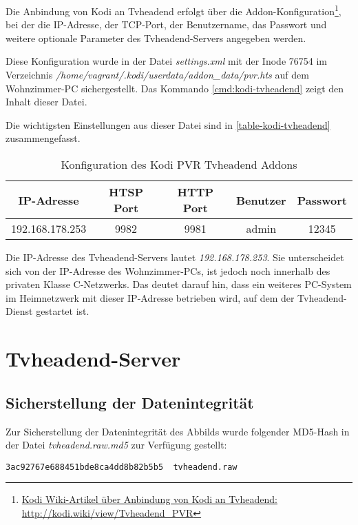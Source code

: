 Die Anbindung von Kodi an Tvheadend erfolgt über die Addon-Konfiguration\footnote{\href{http://kodi.wiki/view/Tvheadend\_PVR\#Connecting\_Kodi\_to\_Tvheadend}{Kodi Wiki-Artikel über Anbindung von Kodi an Tvheadend: http://kodi.wiki/view/Tvheadend\_PVR}}, bei der die IP-Adresse, der TCP-Port, der Benutzername, das Passwort und weitere optionale Parameter des Tvheadend-Servers angegeben werden.

Diese Konfiguration wurde in der Datei \textit{settings.xml} mit der Inode 76754 im Verzeichnis \textit{/home/vagrant/.kodi/userdata/addon\_data/pvr.hts} auf dem Wohnzimmer-PC sichergestellt. Das Kommando \autoref{cmd:kodi-tvheadend} zeigt den Inhalt dieser Datei.

Die wichtigsten Einstellungen aus dieser Datei sind in \autoref{table-kodi-tvheadend} zusammengefasst.

\begin{table}[H]
\centering
\begin{tabular}{ccccc}
\hline 
IP-Adresse & HTSP Port & HTTP Port & Benutzer & Passwort \\ 
\hline 
192.168.178.253 & 9982 & 9981 & admin & 12345 \\ 
\hline 
\end{tabular}
\caption{Konfiguration des Kodi PVR Tvheadend Addons}
\label{table-kodi-tvheadend}
\end{table}

Die IP-Adresse des Tvheadend-Servers lautet \textit{192.168.178.253}. Sie unterscheidet sich von der IP-Adresse des Wohnzimmer-PCs, ist jedoch noch innerhalb des privaten Klasse C-Netzwerks. Das deutet darauf hin, dass ein weiteres PC-System im Heimnetzwerk mit dieser IP-Adresse betrieben wird, auf dem der Tvheadend-Dienst gestartet ist.

\section{Tvheadend-Server}

\subsection{Sicherstellung der Datenintegrität}

Zur Sicherstellung der Datenintegrität des Abbilds wurde folgender MD5-Hash in der Datei \textit{tvheadend.raw.md5} zur Verfügung gestellt:

\begin{verbatim}
3ac92767e688451bde8ca4dd8b82b5b5  tvheadend.raw
\end{verbatim}

